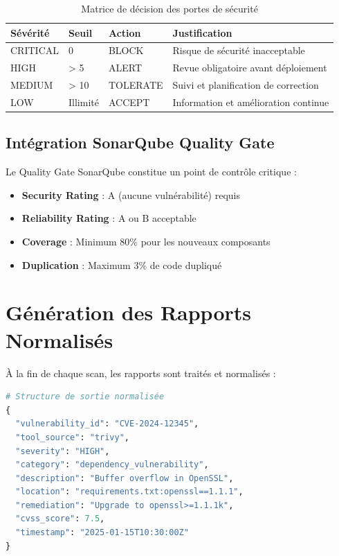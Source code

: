 \documentclass[12pt,a4paper]{report}
\begin{document}
\begin{table}[H]
    \centering
    \begin{tabularx}{\textwidth}{|X|X|X|X|}
        \hline
        \textbf{Sévérité} & \textbf{Seuil} & \textbf{Action} & \textbf{Justification} \\
        \hline
        CRITICAL & 0 & BLOCK & Risque de sécurité inacceptable \\
        \hline
        HIGH & > 5 & ALERT & Revue obligatoire avant déploiement \\
        \hline
        MEDIUM & > 10 & TOLERATE & Suivi et planification de correction \\
        \hline
        LOW & Illimité & ACCEPT & Information et amélioration continue \\
        \hline
    \end{tabularx}
    \caption{Matrice de décision des portes de sécurité}
\end{table}

\subsection{Intégration SonarQube Quality Gate}

Le Quality Gate SonarQube constitue un point de contrôle critique :
\begin{itemize}
    \item \textbf{Security Rating} : A (aucune vulnérabilité) requis
    \item \textbf{Reliability Rating} : A ou B acceptable
    \item \textbf{Coverage} : Minimum 80\% pour les nouveaux composants
    \item \textbf{Duplication} : Maximum 3\% de code dupliqué
\end{itemize}

\section{Génération des Rapports Normalisés}

À la fin de chaque scan, les rapports sont traités et normalisés :

\begin{lstlisting}[language=python]
# Structure de sortie normalisée
{
  "vulnerability_id": "CVE-2024-12345",
  "tool_source": "trivy",
  "severity": "HIGH",
  "category": "dependency_vulnerability",
  "description": "Buffer overflow in OpenSSL",
  "location": "requirements.txt:openssl==1.1.1",
  "remediation": "Upgrade to openssl>=1.1.1k",
  "cvss_score": 7.5,
  "timestamp": "2025-01-15T10:30:00Z"
}
\end{lstlisting}
\end{document}
